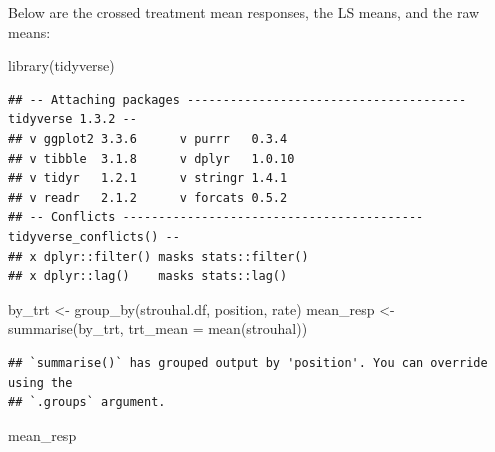 \documentclass[
]{book}
\newenvironment{Shaded}{\begin{snugshade}}{\end{snugshade}}
\newcommand{\AttributeTok}[1]{\textcolor[rgb]{0.77,0.63,0.00}{#1}}
\newcommand{\FunctionTok}[1]{\textcolor[rgb]{0.00,0.00,0.00}{#1}}
\newcommand{\NormalTok}[1]{#1}
\newcommand{\OtherTok}[1]{\textcolor[rgb]{0.56,0.35,0.01}{#1}}
\newcommand{\SpecialCharTok}[1]{\textcolor[rgb]{0.00,0.00,0.00}{#1}}
\begin{document}
\begin{Shaded}
\end{Shaded}

Below are the crossed treatment mean responses, the LS means, and the raw means:

\begin{Shaded}
\begin{Highlighting}[]
\FunctionTok{library}\NormalTok{(tidyverse)}
\end{Highlighting}
\end{Shaded}

\begin{verbatim}
## -- Attaching packages --------------------------------------- tidyverse 1.3.2 --
## v ggplot2 3.3.6      v purrr   0.3.4 
## v tibble  3.1.8      v dplyr   1.0.10
## v tidyr   1.2.1      v stringr 1.4.1 
## v readr   2.1.2      v forcats 0.5.2 
## -- Conflicts ------------------------------------------ tidyverse_conflicts() --
## x dplyr::filter() masks stats::filter()
## x dplyr::lag()    masks stats::lag()
\end{verbatim}

\begin{Shaded}
\begin{Highlighting}[]
\NormalTok{by\_trt }\OtherTok{\textless{}{-}} \FunctionTok{group\_by}\NormalTok{(strouhal.df, position, rate)}
\NormalTok{mean\_resp }\OtherTok{\textless{}{-}} \FunctionTok{summarise}\NormalTok{(by\_trt, }\AttributeTok{trt\_mean =} \FunctionTok{mean}\NormalTok{(strouhal))}
\end{Highlighting}
\end{Shaded}

\begin{verbatim}
## `summarise()` has grouped output by 'position'. You can override using the
## `.groups` argument.
\end{verbatim}

\begin{Shaded}
\begin{Highlighting}[]
\NormalTok{mean\_resp}
\end{Highlighting}
\end{Shaded}
\end{document}
